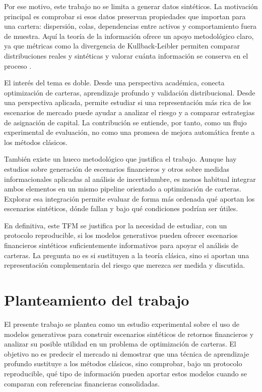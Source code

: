 \documentclass[11pt,a4paper,spanish,oneside]{book}
\numberwithin{equation}{chapter}
\numberwithin{figure}{chapter}
\begin{document}
Por ese motivo, este trabajo no se limita a generar datos sintéticos. La motivación principal es comprobar si esos datos preservan propiedades que importan para una cartera: dispersión, colas, dependencias entre activos y comportamiento fuera de muestra. Aquí la teoría de la información ofrece un apoyo metodológico claro, ya que métricas como la divergencia de Kullback-Leibler permiten comparar distribuciones reales y sintéticas y valorar cuánta información se conserva en el proceso \cite{Kullback1951,Cover2006}.

El interés del tema es doble. Desde una perspectiva académica, conecta optimización de carteras, aprendizaje profundo y validación distribucional. Desde una perspectiva aplicada, permite estudiar si una representación más rica de los escenarios de mercado puede ayudar a analizar el riesgo y a comparar estrategias de asignación de capital. La contribución se entiende, por tanto, como un flujo experimental de evaluación, no como una promesa de mejora automática frente a los métodos clásicos.

También existe un hueco metodológico que justifica el trabajo. Aunque hay estudios sobre generación de escenarios financieros y otros sobre medidas informacionales aplicadas al análisis de incertidumbre, es menos habitual integrar ambos elementos en un mismo pipeline orientado a optimización de carteras. Explorar esa integración permite evaluar de forma más ordenada qué aportan los escenarios sintéticos, dónde fallan y bajo qué condiciones podrían ser útiles.

En definitiva, este TFM se justifica por la necesidad de estudiar, con un protocolo reproducible, si los modelos generativos pueden ofrecer escenarios financieros sintéticos suficientemente informativos para apoyar el análisis de carteras. La pregunta no es si sustituyen a la teoría clásica, sino si aportan una representación complementaria del riesgo que merezca ser medida y discutida.

\section{Planteamiento del trabajo}

El presente trabajo se plantea como un estudio experimental sobre el uso de modelos generativos para construir escenarios sintéticos de retornos financieros y analizar su posible utilidad en un problema de optimización de carteras. El objetivo no es predecir el mercado ni demostrar que una técnica de aprendizaje profundo sustituye a los métodos clásicos, sino comprobar, bajo un protocolo reproducible, qué tipo de información pueden aportar estos modelos cuando se comparan con referencias financieras consolidadas.
\end{document}
